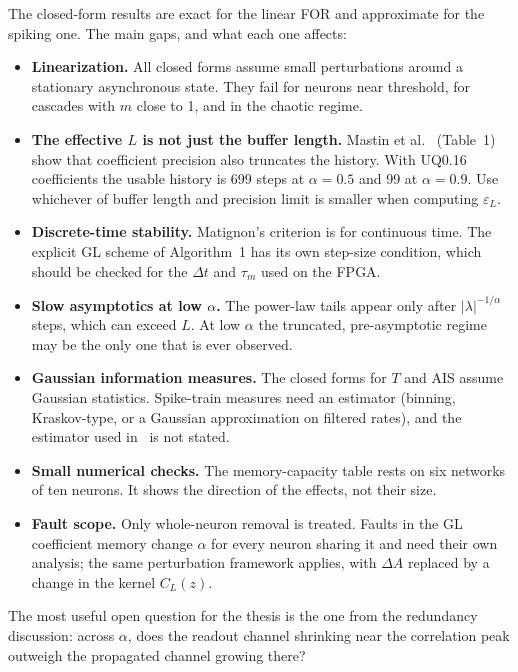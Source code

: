\documentclass[11pt,a4paper]{article}
\begin{document}
The closed-form results are exact for the linear FOR and approximate for the spiking one. The main gaps, and what each one affects:
\begin{itemize}
  \item \textbf{Linearization.} All closed forms assume small perturbations around a stationary asynchronous state. They fail for neurons near threshold, for cascades with $m$ close to 1, and in the chaotic regime.
  \item \textbf{The effective $L$ is not just the buffer length.} Mastin et al.~\cite{mastin2026} (Table~1) show that coefficient precision also truncates the history. With UQ0.16 coefficients the usable history is 699 steps at $\alpha = 0.5$ and 99 at $\alpha = 0.9$. Use whichever of buffer length and precision limit is smaller when computing $\varepsilon_L$.
  \item \textbf{Discrete-time stability.} Matignon's criterion is for continuous time. The explicit GL scheme of Algorithm~1 has its own step-size condition, which should be checked for the $\Delta t$ and $\tau_m$ used on the FPGA.
  \item \textbf{Slow asymptotics at low $\alpha$.} The power-law tails appear only after $|\lambda|^{-1/\alpha}$ steps, which can exceed $L$. At low $\alpha$ the truncated, pre-asymptotic regime may be the only one that is ever observed.
  \item \textbf{Gaussian information measures.} The closed forms for $T$ and AIS assume Gaussian statistics. Spike-train measures need an estimator (binning, Kraskov-type, or a Gaussian approximation on filtered rates), and the estimator used in~\cite{mastin2026} is not stated.
  \item \textbf{Small numerical checks.} The memory-capacity table rests on six networks of ten neurons. It shows the direction of the effects, not their size.
  \item \textbf{Fault scope.} Only whole-neuron removal is treated. Faults in the GL coefficient memory change $\alpha$ for every neuron sharing it and need their own analysis; the same perturbation framework applies, with $\Delta A$ replaced by a change in the kernel $C_L(z)$.
\end{itemize}
The most useful open question for the thesis is the one from the redundancy discussion: across $\alpha$, does the readout channel shrinking near the correlation peak outweigh the propagated channel growing there?

\end{document}
